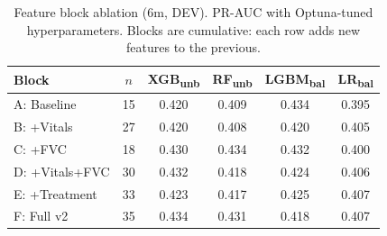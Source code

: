 \begin{table}[ht]
\centering
\caption{Feature block ablation (6m, DEV). PR-AUC with Optuna-tuned hyperparameters. Blocks are cumulative: each row adds new features to the previous.}
\label{tab:ablation_v2}
\small
\begin{tabular}{lccccc}
\toprule
Block & $n$ & XGB\textsubscript{unb} & RF\textsubscript{unb} & LGBM\textsubscript{bal} & LR\textsubscript{bal} \\
\midrule
A: Baseline & 15 & 0.420 & 0.409 & 0.434 & 0.395 \\
B: +Vitals & 27 & 0.420 & 0.408 & 0.420 & 0.405 \\
C: +FVC & 18 & 0.430 & 0.434 & 0.432 & 0.400 \\
D: +Vitals+FVC & 30 & 0.432 & 0.418 & 0.424 & 0.406 \\
E: +Treatment & 33 & 0.423 & 0.417 & 0.425 & 0.407 \\
F: Full v2 & 35 & 0.434 & 0.431 & 0.418 & 0.407 \\
\bottomrule
\end{tabular}
\end{table}